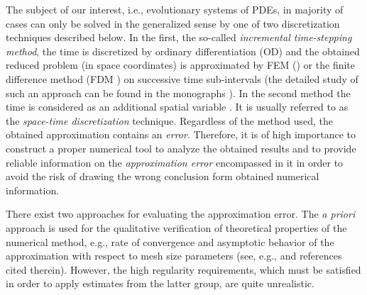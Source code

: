 
The subject of our interest, i.e., evolutionary systems of PDEs, in majority of 
cases can only be solved in the generalized sense by one of two discretization 
techniques described below. In the first, the so-called {\em incremental time-stepping 
method}, the time is discretized by ordinary differentiation (OD) and the obtained 
reduced problem (in space coordinates) is approximated by FEM 
(\cite{Courant1943, Hrennikoff1941, 
Zlamal1968, Ciarlet1978,Johnson2009}) or the finite difference method (FDM 
\cite{Lax1948, RouleauOsterle1955, MortonMayers1994,GrossmannRoosStynes2007,
Crank1975}) on successive time sub-intervals (the detailed study of such an 
approach
can be found in the monographs 
\cite{Thomee2006, Braess2001, Johnson2009}). In the second 
method the time is considered as an additional spatial 
variable \cite{Hackbusch1984,Womble1990,VandewallePiessens1992,HortonVandewalle1995}.
It is usually referred to as the {\em space-time discretization} technique. 
Regardless of the method used, the obtained approximation contains an 
{\em error}. Therefore, it is of high importance to construct a proper numerical tool
to analyze the obtained results and to provide reliable information 
on the {\em approximation error} encompassed in it 
in order to avoid the risk of 
drawing the wrong conclusion form obtained numerical information.

There exist two approaches for evaluating the approximation error. The 
\emph{a priori} approach is used for the qualitative verification of 
theoretical properties of the numerical method, e.g., rate of convergence and 
asymptotic behavior of the approximation with respect to mesh size parameters 
(see, 
e.g., \cite{BrennerScott1994,Ciarlet1978,StrangFix1973} 
and references cited therein). However, the high regularity requirements, which must 
be satisfied in order to apply estimates from the latter group, are quite unrealistic. 

